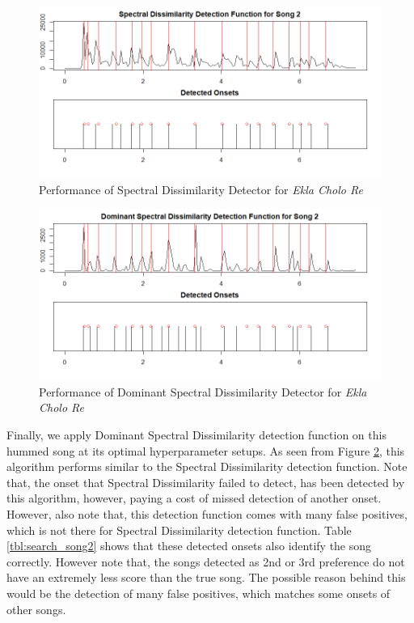 \documentclass[10pt]{article}
\begin{document}
\begin{figure}
    \centering
    \includegraphics[width = \textwidth]{spectral_song2.png}
    \caption{Performance of Spectral Dissimilarity Detector for \textit{Ekla Cholo Re}}
    \label{fig:spectral_song2}
\end{figure}

\begin{figure}
    \centering
    \includegraphics[width = \textwidth]{dfreq_song2.png}
    \caption{Performance of Dominant Spectral Dissimilarity Detector for \textit{Ekla Cholo Re}}
    \label{fig:dfreq_song2}
\end{figure}


Finally, we apply Dominant Spectral Dissimilarity detection function on this hummed song at its optimal hyperparameter setups. As seen from Figure \ref{fig:dfreq_song2}, this algorithm performs similar to the Spectral Dissimilarity detection function. Note that, the onset that Spectral Dissimilarity failed to detect, has been detected by this algorithm, however, paying a cost of missed detection of another onset. However, also note that, this detection function comes with many false positives, which is not there for Spectral Dissimilarity detection function. Table \ref{tbl:search_song2} shows that these detected onsets also identify the song correctly. However note that, the songs detected as 2nd or 3rd preference do not have an extremely less score than the true song. The possible reason behind this would be the detection of many false positives, which matches some onsets of other songs.
\end{document}
